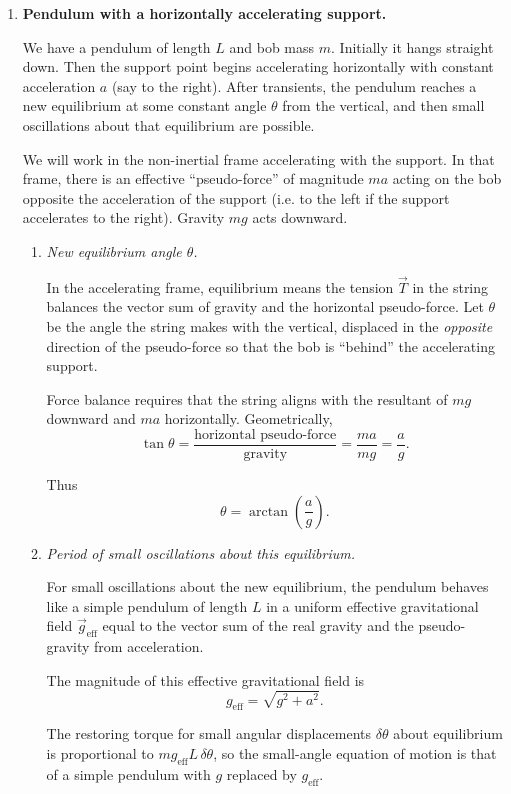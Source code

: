 \documentclass[12pt]{article}
\begin{document}
\begin{enumerate}
\item \textbf{Pendulum with a horizontally accelerating support.}

We have a pendulum of length $L$ and bob mass $m$. Initially it hangs straight down. Then the support point begins accelerating horizontally with constant acceleration $a$ (say to the right). After transients, the pendulum reaches a new equilibrium at some constant angle $\theta$ from the vertical, and then small oscillations about that equilibrium are possible.

We will work in the non-inertial frame accelerating with the support. In that frame, there is an effective ``pseudo-force'' of magnitude $ma$ acting on the bob opposite the acceleration of the support (i.e. to the left if the support accelerates to the right). Gravity $mg$ acts downward.

\begin{enumerate}
    \item \textit{New equilibrium angle $\theta$.}

    In the accelerating frame, equilibrium means the tension $\vec{T}$ in the string balances the vector sum of gravity and the horizontal pseudo-force. Let $\theta$ be the angle the string makes with the vertical, displaced in the \emph{opposite} direction of the pseudo-force so that the bob is ``behind'' the accelerating support.

    Force balance requires that the string aligns with the resultant of $mg$ downward and $ma$ horizontally. Geometrically,
    \[
    \tan \theta = \frac{\text{horizontal pseudo-force}}{\text{gravity}} = \frac{ma}{mg} = \frac{a}{g}.
    \]

    Thus
    \[
    \theta = \arctan\!\left(\frac{a}{g}\right).
    \]

    \item \textit{Period of small oscillations about this equilibrium.}

    For small oscillations about the new equilibrium, the pendulum behaves like a simple pendulum of length $L$ in a uniform effective gravitational field $\vec{g}_\text{eff}$ equal to the vector sum of the real gravity and the pseudo-gravity from acceleration.

    The magnitude of this effective gravitational field is
    \[
    g_\text{eff} = \sqrt{g^2 + a^2}.
    \]

    The restoring torque for small angular displacements $\delta\theta$ about equilibrium is proportional to $mg_\text{eff} L \, \delta\theta$, so the small-angle equation of motion is that of a simple pendulum with $g$ replaced by $g_\text{eff}$.


\end{enumerate}
\end{enumerate}
\end{document}
